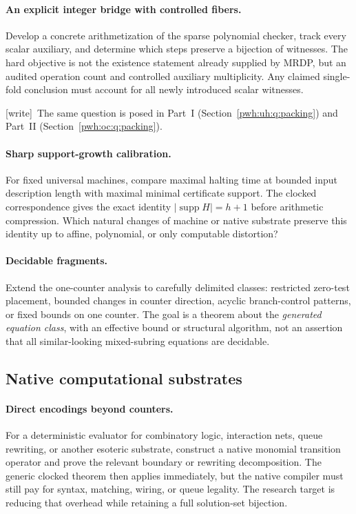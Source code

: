 \documentclass[11pt,letterpaper]{article}
\numberwithin{equation}{section}
\theoremstyle{definition}
\newcommand{\supp}{\operatorname{supp}}
\newcommand{\wtag}{\textup{[write]}}
\begin{document}
\paragraph{An explicit integer bridge with controlled fibers.}
Develop a concrete arithmetization of the sparse polynomial checker,
track every scalar auxiliary, and determine which steps preserve a
bijection of witnesses. The hard objective is not the existence
statement already supplied by MRDP, but an audited operation count and
controlled auxiliary multiplicity. Any claimed single-fold conclusion
must account for all newly introduced scalar witnesses.

\wtag\ The same question is posed in Part~I (Section~\ref{pwh:uh:q:packing})
and Part~II (Section~\ref{pwh:oc:q:packing}).

\paragraph{Sharp support-growth calibration.}
For fixed universal machines, compare maximal halting time at bounded
input description length with maximal minimal certificate support.
The clocked correspondence gives the exact identity
$|\supp H|=h+1$ before arithmetic compression. Which natural changes
of machine or native substrate preserve this identity up to affine,
polynomial, or only computable distortion?

\paragraph{Decidable fragments.}
Extend the one-counter analysis to carefully delimited classes:
restricted zero-test placement, bounded changes in counter direction,
acyclic branch-control patterns, or fixed bounds on one counter.
The goal is a theorem about the \emph{generated equation class}, with
an effective bound or structural algorithm, not an assertion that all
similar-looking mixed-subring equations are decidable.

\subsection{Native computational substrates}
\paragraph{Direct encodings beyond counters.}
For a deterministic evaluator for combinatory logic, interaction nets,
queue rewriting, or another esoteric substrate, construct a native
monomial transition operator and prove the relevant boundary or
rewriting decomposition. The generic clocked theorem then applies
immediately, but the native compiler must still pay for syntax,
matching, wiring, or queue legality. The research target is reducing
that overhead while retaining a full solution-set bijection.
\end{document}
